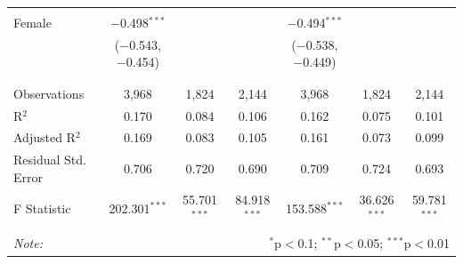 \documentclass[12pt,a4paper]{article}
\numberwithin{equation}{section}
\begin{document}
\begin{landscape}
\begin{table}[!htbp]
\begin{tabular}{@{\extracolsep{5pt}}lcccccc}
			& & & & & & \\ 
			Female & $-$0.498$^{***}$ &  &  & $-$0.494$^{***}$ &  &  \\ 
			& ($-$0.543, $-$0.454) &  &  & ($-$0.538, $-$0.449) &  &  \\ 
			& & & & & & \\ 
			\hline \\[-1.8ex] 
			Observations & 3,968 & 1,824 & 2,144 & 3,968 & 1,824 & 2,144 \\ 
			R$^{2}$ & 0.170 & 0.084 & 0.106 & 0.162 & 0.075 & 0.101 \\ 
			Adjusted R$^{2}$ & 0.169 & 0.083 & 0.105 & 0.161 & 0.073 & 0.099 \\ 
			Residual Std. Error & 0.706 & 0.720 & 0.690 & 0.709 & 0.724 & 0.693 \\ 
			F Statistic & 202.301$^{***}$ & 55.701$^{***}$ & 84.918$^{***}$ & 153.588$^{***}$ & 36.626$^{***}$ & 59.781$^{***}$ \\ 
			\hline 
			\hline \\[-1.8ex] 
			\textit{Note:}  & \multicolumn{6}{r}{$^{*}$p$<$0.1; $^{**}$p$<$0.05; $^{***}$p$<$0.01} \\ 
		\end{tabular} 
	\end{table} 
	
\end{landscape}

\newpage
\end{document}
